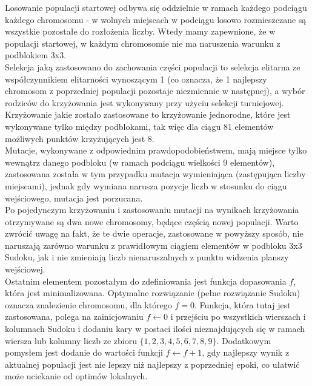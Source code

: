 \documentclass[11pt]{scrartcl} %
\begin{document}
Losowanie populacji startowej odbywa się oddzielnie w ramach każdego podciągu każdego chromosomu - w wolnych miejscach w podciągu losowo rozmieszczane są wszystkie pozostałe do rozłożenia liczby. Wtedy mamy zapewnione, że w populacji startowej, w każdym chromosomie nie ma naruszenia warunku z podblokiem 3x3.\\

Selekcja jaką zastosowano do zachowania części populacji to selekcja elitarna ze współczynnikiem elitarności wynoszącym 1 (co oznacza, że 1 najlepszy chromosom z poprzedniej populacji pozostaje niezmiennie w następnej), a wybór rodziców do krzyżowania jest wykonywany przy użyciu selekcji turniejowej.\\

Krzyżowanie jakie zostało zastosowane to krzyżowanie jednorodne, które jest wykonywane tylko między podblokami, tak więc dla ciągu 81 elementów możliwych punktów krzyżujących jest 8.\\

Mutacje, wykonywane z odpowiednim prawdopodobieństwem, mają miejsce tylko wewnątrz danego podbloku (w ramach podciągu wielkości 9 elementów), zastosowana została w tym przypadku mutacja wymieniająca (zastępująca liczby miejscami), jednak gdy wymiana narusza pozycje liczb w stosunku do ciągu wejściowego, mutacja jest porzucana. \\

Po pojedynczym krzyżowaniu i zastosowaniu mutacji na wynikach krzyżowania otrzymywane są dwa nowe chromosomy, będące częścią nowej populacji. Warto zwrócić uwagę na fakt, że te dwie operacje, zastosowane w powyższy sposób, nie naruszają zarówno warunku z prawidłowym ciągiem elementów w podbloku 3x3 Sudoku, jak i nie zmieniają liczb nienaruszalnych z punktu widzenia planszy wejściowej. \\

Ostatnim elementem pozostałym do zdefiniowania jest funkcja dopasowania $f$, która jest minimalizowana. Optymalne rozwiązanie (pełne rozwiązanie Sudoku) oznacza znalezienie chromosomu, dla którego $f=0$. Funkcja, która tutaj jest zastosowana, polega na zainicjowaniu $f\gets0$ i przejściu po wszystkich wierszach i kolumnach Sudoku i dodaniu kary w postaci ilości nieznajdujących się w ramach wiersza lub kolumny liczb ze zbioru $\{1,2,3,4,5,6,7,8,9\}$. Dodatkowym pomysłem jest dodanie do wartości funkcji $f\gets f+1$, gdy najlepszy wynik z aktualnej populacji jest nie lepszy niż najlepszy z poprzedniej epoki, co ułatwić może uciekanie od optimów lokalnych.\\
\end{document}
